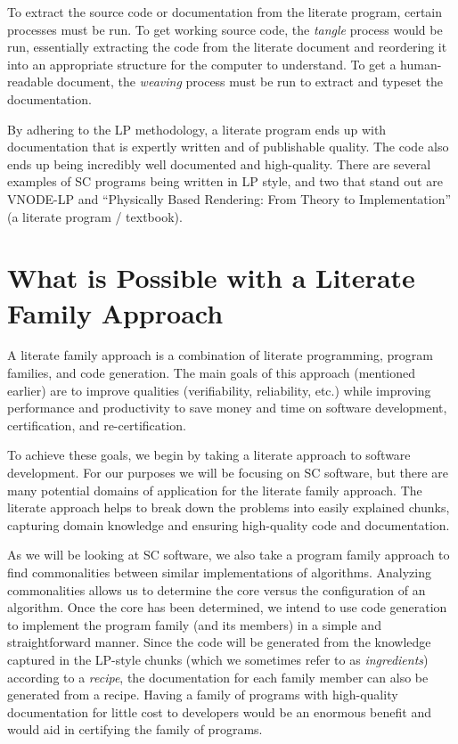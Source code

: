 \documentclass[10pt, preprint]{sigplanconf}
\begin{document}
To extract the source code or documentation from the literate program,
certain processes must be run. To get working source code, the \textit{tangle}
process would be run, essentially extracting the code from the literate document
and reordering it into an appropriate structure for the computer to
understand.  To get a human-readable document, the \textit{weaving}
process must be run to extract and typeset the documentation.

By adhering to the LP methodology, a literate program ends up with documentation
that is expertly written and of publishable quality. The code also ends up being
incredibly well documented and high-quality. There are several examples of SC
programs being written in LP style, and two that stand out are VNODE-LP
\cite{Nedialkov2006} and ``Physically Based Rendering: From Theory to
Implementation'' \cite{PharrHumphreys2004} (a literate program / textbook).

\section{What is Possible with a Literate Family Approach} \label{sec:what}

A literate family approach is a combination of literate programming, program
families, and code generation. The main goals of this approach (mentioned
earlier) are to improve qualities (verifiability, reliability, etc.) while
improving performance and productivity to save money and time on software
development, certification, and re-certification.

To achieve these goals, we begin by taking a literate approach to
software development. For our purposes we will be focusing on SC software, but
there are many potential domains of application for the literate family
approach. The literate approach helps to break down the problems into easily
explained chunks, capturing domain knowledge and ensuring high-quality code and
documentation.

As we will be looking at SC software, we also take a program family approach to
find commonalities between similar implementations of algorithms. Analyzing
commonalities allows us to determine the core versus the configuration of an
algorithm. Once the core has been determined, we intend to use code generation
to implement the program family (and its members) in a simple and
straightforward manner. Since the code will be generated from the knowledge
captured in the LP-style chunks (which we sometimes refer to as
\textit{ingredients}) according to a \textit{recipe}, the documentation for each
family member can also be generated from a
recipe. %
Having a family of programs with high-quality documentation for little cost to
developers would be an enormous benefit and would aid in certifying the family
of programs.
\end{document}

